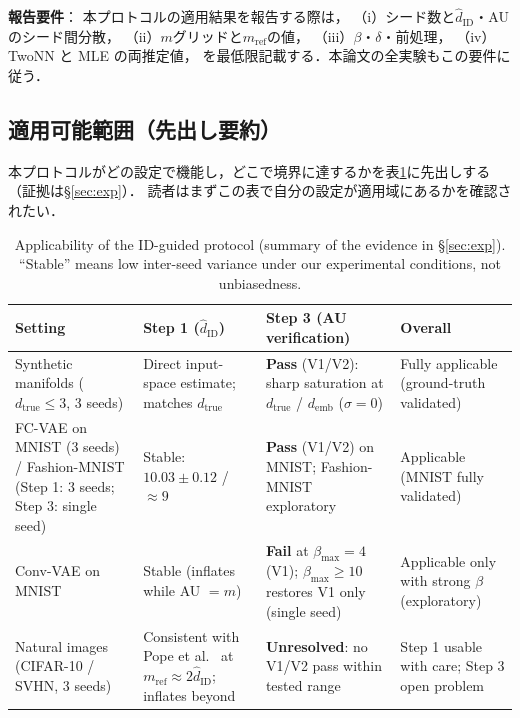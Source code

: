 \documentclass[11pt,a4paper]{jsarticle}
\newcommand{\hatdID}{\hat{d}_{\mathrm{ID}}}
\newcommand{\dtrue}{d_{\mathrm{true}}}
\newcommand{\demb}{d_{\mathrm{emb}}}
\begin{document}
\textbf{報告要件}：
本プロトコルの適用結果を報告する際は，
（i）シード数と$\hatdID$・AU のシード間分散，
（ii）$m$グリッドと$m_{\mathrm{ref}}$の値，
（iii）$\beta$・$\delta$・前処理，
（iv）TwoNN と MLE の両推定値，
を最低限記載する．本論文の全実験もこの要件に従う．

\subsection{適用可能範囲（先出し要約）}\label{sec:protocol_applicability}

本プロトコルがどの設定で機能し，どこで境界に達するかを表\ref{tab:applicability}に先出しする
（証拠は§\ref{sec:exp}）．
読者はまずこの表で自分の設定が適用域にあるかを確認されたい．

\begin{table}[H]
\centering
\caption{Applicability of the ID-guided protocol (summary of the evidence in
§\ref{sec:exp}). ``Stable'' means low inter-seed variance under our
experimental conditions, not unbiasedness.}
\label{tab:applicability}
\small
\begin{tabular}{p{3.0cm}p{3.2cm}p{3.4cm}p{4.2cm}}
\toprule
Setting & Step 1 ($\hatdID$) & Step 3 (AU verification) & Overall \\
\midrule
Synthetic manifolds ($\dtrue \leq 3$, 3 seeds) & Direct input-space estimate; matches $\dtrue$ & \textbf{Pass} (V1/V2): sharp saturation at $\dtrue$ / $\demb$ ($\sigma = 0$) & Fully applicable (ground-truth validated) \\
\addlinespace
FC-VAE on MNIST (3 seeds) / Fashion-MNIST (Step 1: 3 seeds; Step 3: single seed) & Stable: $10.03 \pm 0.12$ / $\approx 9$ & \textbf{Pass} (V1/V2) on MNIST; Fashion-MNIST exploratory & Applicable (MNIST fully validated) \\
\addlinespace
Conv-VAE on MNIST & Stable (inflates while AU $= m$) & \textbf{Fail} at $\beta_{\max} = 4$ (V1); $\beta_{\max} \geq 10$ restores V1 only (single seed) & Applicable only with strong $\beta$ (exploratory) \\
\addlinespace
Natural images (CIFAR-10 / SVHN, 3 seeds) & Consistent with Pope et al.~\cite{pope2021intrinsic} at $m_{\mathrm{ref}} \approx 2\hatdID$; inflates beyond & \textbf{Unresolved}: no V1/V2 pass within tested range & Step 1 usable with care; Step 3 open problem \\
\bottomrule
\end{tabular}
\end{table}

\end{document}

